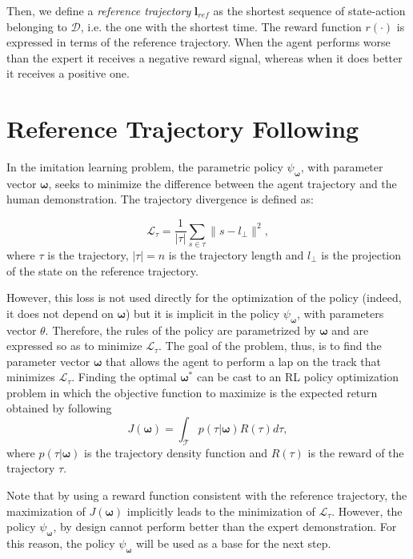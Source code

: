 Then, we define a \textit{reference trajectory} $\boldsymbol l_{ref}$ as the shortest sequence of state-action belonging to $\mathcal{D}$, i.e. the one with the shortest time.
The reward function $r(\cdot)$ is expressed in terms of the reference trajectory. When the agent performs worse than the expert it receives a negative reward signal, whereas when it does better it receives a positive one.

\section{Reference Trajectory Following}
\label{ref_follow}

In the imitation learning problem, the parametric policy $\psi_{\boldsymbol \omega}$, with parameter vector $\boldsymbol \omega$, seeks to minimize the difference between the agent trajectory and the human demonstration. The trajectory divergence is defined as:

\begin{equation}\mathcal{L}_\tau = \frac{1}{|\tau|} \sum_{s \in \tau} {\lVert}{s - l_\perp}{\rVert}^2, \end{equation} where $\tau$ is the trajectory, $|\tau| = n$ is the trajectory length and $l_\perp$ is the projection of the state on the reference trajectory.

However, this loss is not used directly for the optimization of the policy (indeed, it does not depend on $\boldsymbol \omega$) but it is implicit in the policy $\psi_{\boldsymbol \omega}$, with parameters vector $\theta$. Therefore, the rules of the policy are parametrized by $\boldsymbol \omega$ and are expressed so as to minimize $\mathcal{L}_\tau.$ The goal of the problem, thus, is to find the parameter vector $\boldsymbol \omega$ that allows the agent to perform a lap on the track that minimizes $\mathcal{L}_\tau$. Finding the optimal $\boldsymbol \omega^*$ can be cast to an RL policy optimization problem in which the objective function to maximize is the expected return obtained by following 
\begin{equation}J(\boldsymbol \omega)=\int_{\mathcal{T}} p(\tau|\boldsymbol \omega)R(\tau)d \tau,\end{equation}
where $p(\tau|\boldsymbol \omega)$ is the trajectory density function and $R(\tau)$ is the reward of the trajectory $\tau$.

Note that by using a reward function consistent with the reference trajectory, the maximization of $J(\boldsymbol \omega)$ implicitly leads to the minimization of $\mathcal{L}_\tau.$
However, the policy $\psi_{\boldsymbol \omega}$, by design cannot perform better than the expert demonstration. For this reason, the policy $\psi_{\boldsymbol \omega}$ will be used as a base for the next step.







